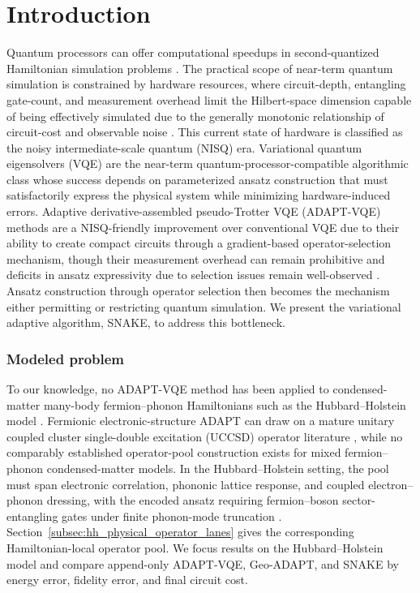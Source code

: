\documentclass[
  reprint,
  amsmath,
  amssymb,
  aps,
  pra,
  nofootinbib,
  superscriptaddress,
  floatfix
]{revtex4-2}
\begin{document}
\section{Introduction}

Quantum processors can offer computational speedups in second-quantized Hamiltonian simulation problems \cite{Lloyd1996,AspuruGuzik2005}. The practical scope of near-term quantum simulation is constrained by hardware resources, where circuit-depth, entangling gate-count, and measurement overhead limit the Hilbert-space dimension capable of being effectively simulated due to the generally monotonic relationship of circuit-cost and observable noise \cite{Preskill2018NISQ,Cerezo2021VQA,Huggins2021Measurements}. This current state of hardware is classified as the noisy intermediate-scale quantum (NISQ) era. Variational quantum eigensolvers (VQE) are the near-term quantum-processor-compatible algorithmic class whose success depends on parameterized ansatz construction that must satisfactorily express the physical system while minimizing hardware-induced errors. Adaptive derivative-assembled pseudo-Trotter VQE (ADAPT-VQE) methods are a NISQ-friendly improvement over conventional VQE due to their ability to create compact circuits through a gradient-based operator-selection mechanism, though their measurement overhead can remain prohibitive and deficits in ansatz expressivity due to selection issues remain well-observed \cite{Grimsley2019,Tang2021,Yordanov2021,Feniou2023,Ramoa2025HessianRecycling,Ikhtiarudin2025ShotEfficient}. Ansatz construction through operator selection then becomes the mechanism either permitting or restricting quantum simulation. We present the variational adaptive algorithm, SNAKE, to address this bottleneck.


\subsubsection{Modeled problem}
To our knowledge, no ADAPT-VQE method has been applied to condensed-matter many-body fermion--phonon Hamiltonians such as the Hubbard--Holstein model \cite{Macridin2018,Li2023,Denner2023,Majland2024vADAPT}. Fermionic electronic-structure ADAPT can draw on a mature unitary coupled cluster single-double excitation (UCCSD) operator literature \cite{Romero2018UCC,Grimsley2019}, while no comparably established operator-pool construction exists for mixed fermion--phonon condensed-matter models. In the Hubbard--Holstein setting, the pool must span electronic correlation, phononic lattice response, and coupled electron--phonon dressing, with the encoded ansatz requiring fermion--boson sector-entangling gates under finite phonon-mode truncation \cite{Hubbard1963,Holstein1959a,Holstein1959b}. Section~\ref{subsec:hh_physical_operator_lanes} gives the corresponding Hamiltonian-local operator pool. We focus results on the Hubbard--Holstein model and compare append-only ADAPT-VQE, Geo-ADAPT, and SNAKE by energy error, fidelity error, and final circuit cost.
\end{document}
